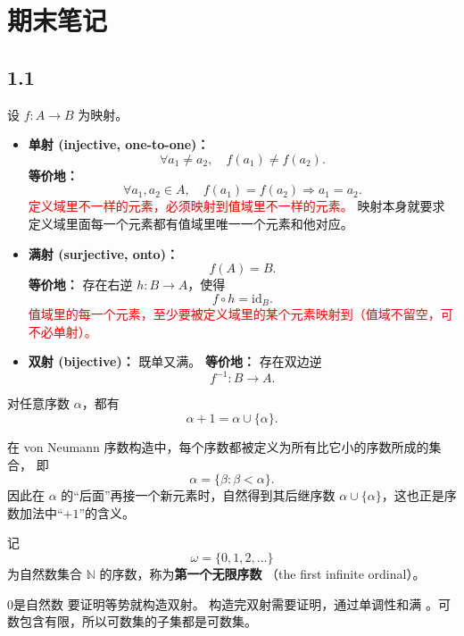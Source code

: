 \chapter{期末笔记}
\section{1.1}
\begin{definition}[单射/满射/双射]
设 $f:A\to B$ 为映射。

\begin{itemize}
  \item \textbf{单射 (injective, one-to-one)：}
  \[
  \forall a_1\neq a_2,\quad f(a_1)\neq f(a_2).
  \]
  \textbf{等价地：}
  \[
  \forall a_1,a_2\in A,\quad f(a_1)=f(a_2)\Rightarrow a_1=a_2.
  \]
  \textcolor{red}{定义域里不一样的元素，必须映射到值域里不一样的元素。}
  映射本身就要求定义域里面每一个元素都有值域里唯一一个元素和他对应。
  \item \textbf{满射 (surjective, onto)：}
  \[
  f(A)=B.
  \]
  \textbf{等价地：} 存在右逆 $h:B\to A$，使得
  \[
  f\circ h=\mathrm{id}_B.
  \]
  \textcolor{red}{值域里的每一个元素，至少要被定义域里的某个元素映射到（值域不留空，可不必单射）。}

  \item \textbf{双射 (bijective)：} 既单又满。 \textbf{等价地：} 存在双边逆
  \[
  f^{-1}:B\to A.
  \]
\end{itemize}
\end{definition}
\begin{theorem}
对任意序数 $\alpha$，都有
\[
\alpha+1=\alpha\cup\{\alpha\}.
\]
\end{theorem}

\begin{remark}
在 von Neumann 序数构造中，每个序数都被定义为所有比它小的序数所成的集合，
即
\[
\alpha=\{\beta:\beta<\alpha\}.
\]
因此在 $\alpha$ 的“后面”再接一个新元素时，自然得到其后继序数
\(
\alpha\cup\{\alpha\}
\)，这也正是序数加法中“$+1$”的含义。
\end{remark}

\begin{definition}
记
\[
\omega=\{0,1,2,\dots\}
\]
为自然数集合 $\mathbb N$ 的序数，称为\textbf{第一个无限序数}
（the first infinite ordinal）。
\end{definition}

0是自然数
要证明等势就构造双射。
构造完双射需要证明，通过单调性和满
。可数包含有限，所以可数集的子集都是可数集。

